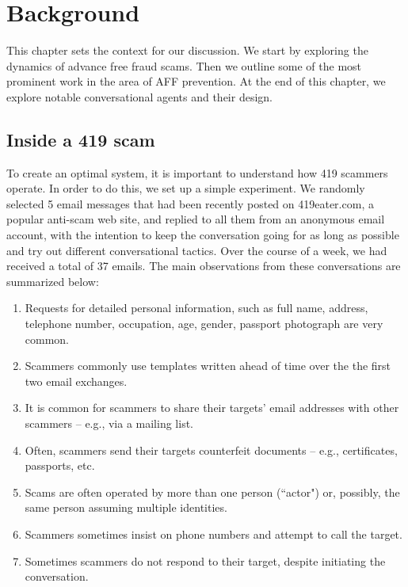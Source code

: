 \chapter{Background}
This chapter sets the context for our discussion. We start by exploring the dynamics of advance free fraud scams. Then we outline some of the most prominent work in the area of AFF prevention. At the end of this chapter, we explore notable conversational agents and their design.

\section{Inside a 419 scam}
To create an optimal system, it is important to understand how 419 scammers operate. In order to do this, we set up a simple experiment. We randomly selected 5 email messages that had been recently posted on 419eater.com, a popular anti-scam web site, and replied to all them from an anonymous email account, with the intention to keep the conversation going for as long as possible and try out different conversational tactics. Over the course of a week, we had received a total of 37 emails. The main observations from these conversations are summarized below:
\begin{enumerate}
\item Requests for detailed personal information, such as full name, address, telephone number, occupation, age, gender, passport photograph are very common.
\item Scammers commonly use templates written ahead of time over the the first two email exchanges.
\item It is common for scammers to share their targets' email addresses with other scammers -- e.g., via a mailing list.
\item Often, scammers send their targets counterfeit documents -- e.g., certificates, passports, etc.
\item Scams are often operated by more than one person (``actor") or, possibly, the same person assuming multiple identities.
\item Scammers sometimes insist on phone numbers and attempt to call the target.
\item Sometimes scammers do not respond to their target, despite initiating the conversation.
\end{enumerate}

